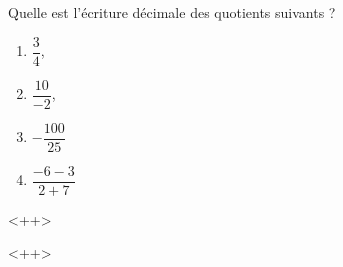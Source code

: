
\begin{exercice}\label{exosmath-0749}

    Quelle est l'écriture décimale des quotients suivants ?
    \begin{multicols}{2}
        \begin{enumerate}
            \item
                \( \dfrac{ 3 }{ 4 }\),
            \item
                $\dfrac{10}{-2}$,
            \item
                \( -\dfrac{ 100 }{ 25 }\)
            \item
                \( \dfrac{ -6-3 }{ 2+7 }\)
        \end{enumerate}<++>
    \end{multicols}
    <++>

\end{exercice}

